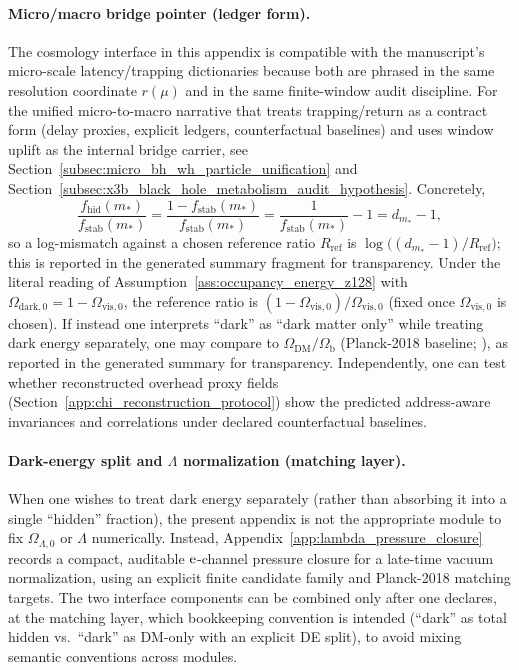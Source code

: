 \paragraph{Micro/macro bridge pointer (ledger form).}
\AuditTag The cosmology interface in this appendix is compatible with the manuscript's micro-scale latency/trapping dictionaries because both are phrased in the same resolution coordinate $r(\mu)$ and in the same finite-window audit discipline.
For the unified micro-to-macro narrative that treats trapping/return as a contract form (delay proxies, explicit ledgers, counterfactual baselines) and uses window uplift as the internal bridge carrier,
see Section~\ref{subsec:micro_bh_wh_particle_unification} and Section~\ref{subsec:x3b_black_hole_metabolism_audit_hypothesis}.
\MatchTag Concretely,
\[
\frac{f_{\mathrm{hid}}(m_\ast)}{f_{\mathrm{stab}}(m_\ast)}
=\frac{1-f_{\mathrm{stab}}(m_\ast)}{f_{\mathrm{stab}}(m_\ast)}
  =\frac{1}{f_{\mathrm{stab}}(m_\ast)}-1
  =d_{m_\ast}-1,
\]
so a log-mismatch against a chosen reference ratio $R_{\mathrm{ref}}$ is
$\log\!\bigl((d_{m_\ast}-1)/R_{\mathrm{ref}}\bigr)$; this is reported in the generated summary fragment for transparency.
\MatchTag Under the literal reading of Assumption~\ref{ass:occupancy_energy_z128} with $\Omega_{\mathrm{dark},0}=1-\Omega_{\mathrm{vis},0}$, the reference ratio is $(1-\Omega_{\mathrm{vis},0})/\Omega_{\mathrm{vis},0}$ (fixed once $\Omega_{\mathrm{vis},0}$ is chosen).
\MatchTag If instead one interprets ``dark'' as ``dark matter only'' while treating dark energy separately, one may compare to $\Omega_{\mathrm{DM}}/\Omega_{\mathrm{b}}$ (Planck-2018 baseline; \cite{Planck2018Parameters}), as reported in the generated summary for transparency.
Independently, one can test whether reconstructed overhead proxy fields (Section~\ref{app:chi_reconstruction_protocol}) show the predicted address-aware invariances and correlations under declared counterfactual baselines.

\paragraph{Dark-energy split and \texorpdfstring{$\Lambda$}{Lambda} normalization (matching layer).}
\MatchTag When one wishes to treat dark energy separately (rather than absorbing it into a single ``hidden'' fraction), the present appendix is not the appropriate module to fix $\Omega_{\Lambda,0}$ or $\Lambda$ numerically.
Instead, Appendix~\ref{app:lambda_pressure_closure} records a compact, auditable $\mathrm{e}$-channel pressure closure for a late-time vacuum normalization, using an explicit finite candidate family and Planck-2018 matching targets.
\InterfaceTag The two interface components can be combined only after one declares, at the matching layer, which bookkeeping convention is intended (``dark'' as total hidden vs.\ ``dark'' as DM-only with an explicit DE split), to avoid mixing semantic conventions across modules.

